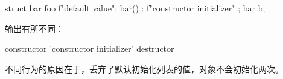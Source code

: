 \begin{cpp}
struct bar
{
    foo f{"default value"};
    bar() : f{"constructor initializer"}
    {
    }
};
bar b;
\end{cpp}

输出有所不同：

\begin{shell}
constructor 'constructor initializer'
destructor
\end{shell}

不同行为的原因在于，丢弃了默认初始化列表的值，对象不会初始化两次。
























